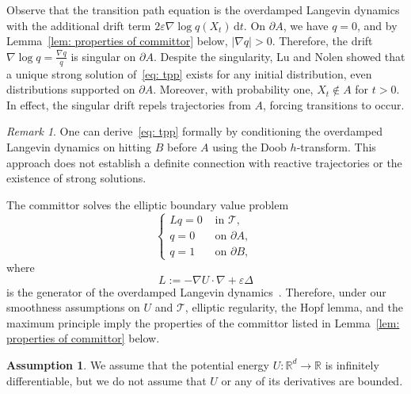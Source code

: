 \documentclass[reqno]{amsart}
\newcommand{\Real}{\mathbb{R}}
\newcommand{\eps}{\varepsilon}
\newcommand{\1}{\mathds{1}}
\renewcommand{\d}{\mathrm{d}}
\newcommand{\grad}{\nabla}
\newcommand{\lap}{\Delta}
\theoremstyle{definition}
\newtheorem{assumption}{Assumption}
\theoremstyle{remark}
\newtheorem{remark}{Remark}
\newcommand{\D}{\mathscr{T}}
\begin{document}
Observe that the transition path equation is the overdamped Langevin dynamics with the additional drift term $2 \eps \grad \log q(X_t) \, \d t$. On $\partial A$, we have $q = 0$, and by Lemma~\ref{lem: properties of committor} below, $\lvert \grad q \rvert >0$. Therefore, the drift $\grad \log q = \frac{\grad q}{q}$ is singular on $\partial A$. Despite the singularity, Lu and Nolen showed that a unique strong solution of~\eqref{eq: tpp} exists for any initial distribution, even distributions supported on $\partial A$. Moreover, with probability one, $X_t \notin A$ for $t >0$. In effect, the singular drift repels trajectories from $A$, forcing transitions to occur. 

\begin{remark}
One can derive~\eqref{eq: tpp} formally by conditioning the overdamped Langevin dynamics on hitting $B$ before $A$ using the Doob $h$-transform. This approach does not establish a definite connection with reactive trajectories or the existence of strong solutions. 
\end{remark}

The committor solves the elliptic boundary value problem
\begin{equation}\label{eq: elliptic commitor equation}
  \begin{cases}
    L q = 0 &\text{ in } \D, \\
    q=0 &\text{ on } \partial A, \\
    q = 1 &\text{ on } \partial B,\
  \end{cases}
\end{equation}
where
\begin{equation*}
L := - \grad U \cdot \grad + \eps \lap
\end{equation*}
is the generator of the overdamped Langevin dynamics~\cite{e_towards_2006}.  Therefore, under our smoothness assumptions on $U$ and $\D$, elliptic regularity, the Hopf lemma, and the maximum principle imply the properties of the committor listed in Lemma~\ref{lem: properties of committor} below. 

\begin{assumption}\label{asm: smoothness of potential}
We assume that the potential energy $U: \Real^d \rightarrow \Real$ is infinitely differentiable, but we do not assume that $U$ or any of its derivatives are bounded. 
\end{assumption}
\end{document}
